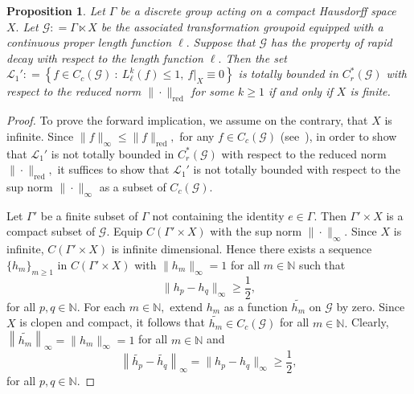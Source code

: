 \documentclass[a4paper,11pt,reqno]{amsart}
\theoremstyle{plain}
\newtheorem{prop}[thm]{Proposition}
\theoremstyle{named}
\numberwithin{equation}{section}
\begin{document}
			
			
			
			\begin{prop}\label{prop20}
				Let $\Gamma$ be a discrete group acting on a compact Hausdorff space $X.$ Let $\mathcal G : = \Gamma \ltimes X$ be the associated transformation groupoid equipped with a continuous proper length function $\ell.$ Suppose that $\mathcal G$ has the property of rapid decay with respect to the length function $\ell.$ Then the set $\mathcal L_1' : = \left \{f \in C_c (\mathcal G)\ :\ L_{\ell}^k(f) \leq 1,\ f\rvert_X \equiv 0 \right \}$ is totally bounded in $C_r^{\ast} (\mathcal G)$ with respect to the reduced norm $\|\cdot\|_{\mathrm {red}}$ for some $k \geq 1$ if and only if $X$ is finite.
			\end{prop}
			
			\begin{proof}
				To prove the forward implication, we assume on the contrary, that $X$ is infinite. Since $\|f\|_{\infty} \leq \|f\|_{\mathrm {red}},$ for any $f \in C_c (\mathcal G)$ (see~\cite[Lemma 5.6.12.]{brownc}), in order to show that $\mathcal L_1'$ is not totally bounded in $C_r^{\ast} (\mathcal G)$ with respect to the reduced norm $\|\cdot\|_{\mathrm {red}},$ it suffices to show that $\mathcal L_1'$ is not totally bounded with respect to the sup norm $\|\cdot\|_{\infty}$ as a subset of $C_c (\mathcal G).$
				
				\vspace{2mm}
				
				Let $\Gamma'$ be a finite subset of $\Gamma$ not containing the identity $e \in \Gamma.$ Then $\Gamma' \times X$ is a compact subset of $\mathcal G.$ Equip $C (\Gamma' \times X)$ with the sup norm $\|\cdot\|_{\infty}.$ Since $X$ is infinite, $C(\Gamma' \times X)$ is infinite dimensional. Hence there exists a sequence $\{h_m\}_{m \geq 1}$ in $C (\Gamma' \times X)$ with $\|h_m\|_{\infty} = 1$ for all $m \in \mathbb N$ such that $$\|h_p - h_q\|_{\infty} \geq \frac {1} {2},$$ for all $p, q \in \mathbb N.$ For each $m \in \mathbb N,$ extend $h_m$ as a function $\widetilde {h_m}$ on $\mathcal G$ by zero. Since $X$ is clopen and compact, it follows that $\widetilde {h_m} \in C_c (\mathcal G)$ for all $m \in \mathbb N.$ Clearly, $\left \|\widetilde {h_m} \right \|_{\infty} = \|h_m\|_{\infty} = 1$ for all $m \in \mathbb N$ and $$\left \|\widetilde {h_p} - \widetilde {h_q} \right \|_{\infty} = \|h_p - h_q\|_{\infty} \geq \frac {1} {2},$$ for all $p, q \in \mathbb N.$
				
				\vspace{2mm}
				

\end{proof}
\end{document}
